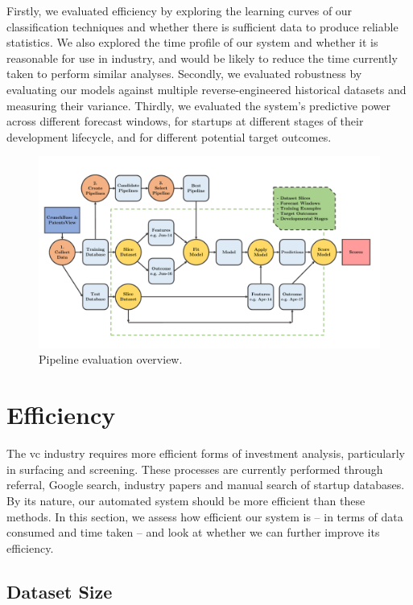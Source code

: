 ﻿\documentclass[../thesis/thesis.tex]{subfiles}
\begin{document}
Firstly, we evaluated efficiency by exploring the learning curves of our classification techniques and whether there is sufficient data to produce reliable statistics. We also explored the time profile of our system and whether it is reasonable for use in industry, and would be likely to reduce the time currently taken to perform similar analyses. Secondly, we evaluated robustness by evaluating our models against multiple reverse-engineered historical datasets and measuring their variance. Thirdly, we evaluated the system's predictive power across different forecast windows, for startups at different stages of their development lifecycle, and for different potential target outcomes.

\begin{figure}[!htb]
    \centering
    \includegraphics[width=\textwidth]{../figures/evaluation/flowchart_evaluation}
    \caption[Pipeline evaluation flowchart]{Pipeline evaluation overview.}
    \label{fig:evaluation:pipeline_evaluation}
\end{figure}

\section{Efficiency}

The \gls{vc} industry requires more efficient forms of investment analysis, particularly in surfacing and screening. These processes are currently performed through referral, Google search, industry papers and manual search of startup databases. By its nature, our automated system should be more efficient than these methods. In this section, we assess how efficient our system is -- in terms of data consumed and time taken -- and look at whether we can further improve its efficiency.

\subsection{Dataset Size}
\end{document}
